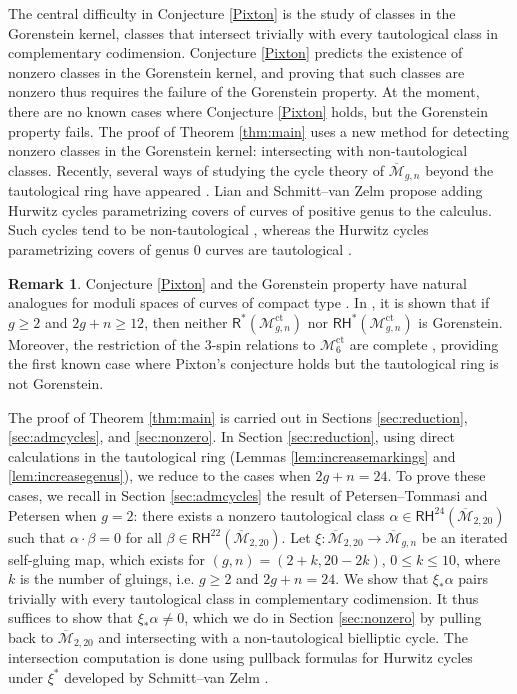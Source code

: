 \documentclass[12pt]{amsart}
\theoremstyle{definition}
\newtheorem{rem}[thm]{Remark}
\newcommand{\R}{\mathsf{R}}
\newcommand{\RH}{\mathsf{RH}}
\newcommand{\M}{\mathcal{M}}
\DeclareMathOperator{\ct}{ct}
\newcommand{\Mb}{\overline{\M}}
\begin{document}
The central difficulty in Conjecture \ref{Pixton} is the study of classes in the Gorenstein kernel, classes that intersect trivially with every tautological class in complementary codimension. Conjecture \ref{Pixton} predicts the existence of nonzero classes in the Gorenstein kernel, and proving that such classes are nonzero thus requires the failure of the Gorenstein property. At the moment, there are no known cases where Conjecture \ref{Pixton} holds, but the Gorenstein property fails. The proof of Theorem \ref{thm:main} uses a new method for detecting nonzero classes in the Gorenstein kernel: intersecting with non-tautological classes. Recently, several ways of studying the cycle theory of $\Mb_{g,n}$ beyond the tautological ring have appeared \cite{SvZ, Lian, CLP-ste}. Lian and Schmitt--van Zelm propose adding Hurwitz cycles parametrizing covers of curves of positive genus to the calculus. Such cycles tend to be non-tautological \cite{GraberPandharipande,vanZelm,Liannontaut,AGNES}, whereas the Hurwitz cycles parametrizing covers of genus $0$ curves are tautological \cite{FaberPandharipande}.

\begin{rem}
    Conjecture \ref{Pixton} and the Gorenstein property have natural analogues for moduli spaces of curves of compact type \cite{Pixton, FPspeculation,Pan3questions}. In \cite{CLSGorenstein}, it is shown that if $g\geq 2$ and $2g+n\geq 12$, then neither $\R^*(\M_{g,n}^{\ct})$ nor $\RH^*(\M_{g,n}^{\ct})$ is Gorenstein. Moreover, the restriction of the $3$-spin relations to $\M_6^{\ct}$ are complete \cite{CLSGorenstein}, providing the first known case where Pixton's conjecture holds but the tautological ring is not Gorenstein. 
\end{rem}

The proof of Theorem \ref{thm:main} is carried out in Sections \ref{sec:reduction}, \ref{sec:admcycles}, and \ref{sec:nonzero}. In Section \ref{sec:reduction}, using direct calculations in the tautological ring (Lemmas \ref{lem:increasemarkings} and \ref{lem:increasegenus}), we reduce to the cases when $2g+n=24$. To prove these cases, we recall in Section \ref{sec:admcycles} the result of Petersen--Tommasi \cite{PetersenTommasi} and Petersen \cite{Petersen} when $g=2$: there exists a nonzero tautological class $\alpha\in \RH^{24}(\Mb_{2,20})$ such that $\alpha\cdot \beta=0$ for all $\beta\in \RH^{22}(\Mb_{2,20})$. Let $\xi:\Mb_{2,20}\rightarrow \Mb_{g,n}$ be an iterated self-gluing map, which exists for $(g,n)=(2+k,20-2k)$, $0\leq k\leq 10$, where $k$ is the number of gluings, i.e. $g\geq 2$ and $2g+n=24$. We show that $\xi_*\alpha$ pairs trivially with every tautological class in complementary codimension. It thus suffices to show that $\xi_*\alpha\neq 0$, which we do in Section \ref{sec:nonzero} by pulling back to $\Mb_{2,20}$ and intersecting with a non-tautological bielliptic cycle. The intersection computation is done using pullback formulas for Hurwitz cycles under $\xi^*$ developed by Schmitt--van Zelm \cite{SvZ}. 
\end{document}
